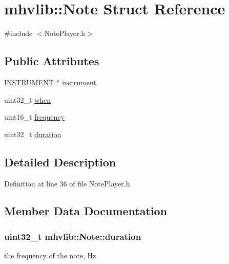 \hypertarget{structmhvlib_1_1_note}{\section{mhvlib\-:\-:Note Struct Reference}
\label{structmhvlib_1_1_note}
}


{\ttfamily \#include $<$Note\-Player.\-h$>$}

\subsection*{Public Attributes}
\begin{DoxyCompactItemize}
\item 
\hyperlink{namespacemhvlib_abe46c8922ff2f901a0a36e388bb411bc}{I\-N\-S\-T\-R\-U\-M\-E\-N\-T} $\ast$ \hyperlink{structmhvlib_1_1_note_a58b2618885a7861d7c657543433ff58f}{instrument}
\item 
uint32\-\_\-t \hyperlink{structmhvlib_1_1_note_a05011cabe9b47a1d0384e10edc30dd2f}{when}
\item 
uint16\-\_\-t \hyperlink{structmhvlib_1_1_note_a29b0c3643a51dd13e1b213c92feab31d}{frequency}
\item 
uint32\-\_\-t \hyperlink{structmhvlib_1_1_note_a0db43f33502baf81e2aabc4737dcfdf0}{duration}
\end{DoxyCompactItemize}


\subsection{Detailed Description}


Definition at line 36 of file Note\-Player.\-h.



\subsection{Member Data Documentation}
\hypertarget{structmhvlib_1_1_note_a0db43f33502baf81e2aabc4737dcfdf0}{
\subsubsection[{duration}]{\setlength{\rightskip}{0pt plus 5cm}uint32\-\_\-t mhvlib\-::\-Note\-::duration}}\label{structmhvlib_1_1_note_a0db43f33502baf81e2aabc4737dcfdf0}
the frequency of the note, Hz 

